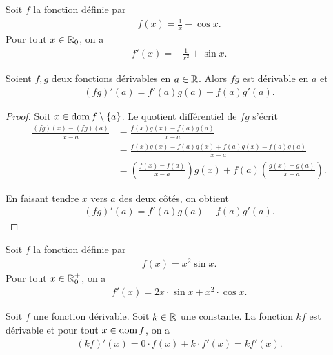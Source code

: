 \documentclass[main.tex]{subfiles}
\begin{document}
\begin{example}
    Soit $f$ la fonction définie par 
    \begin{align}
        f(x) = \frac{1}{x} - \cos x.
    \end{align}
    Pour tout $x \in \mathbb{R}_0$, on a 
    \begin{align}
        f'(x) = -\frac{1}{x^2} + \sin x.
    \end{align}
\end{example}

\begin{proposition}

    Soient $f, g$ deux fonctions dérivables en $a \in \mathbb{R}$.
    Alors $f g$ est dérivable en $a$ et
    \begin{align}
        (f g)'(a) = f'(a) g(a) + f(a) g'(a).
    \end{align}
\end{proposition}
\begin{proof}
    Soit $x \in \operatorname{dom} f \setminus \{a\}$.
    Le quotient différentiel de $f g$ s'écrit
    \begin{align}
        \frac {(f g)(x) - (f g)(a)} {x - a}
        &= \frac {f(x) g(x) - f(a) g(a)} {x - a}\\
        &= \frac {f(x) g(x) - f(a) g(x) + f(a) g(x) - f(a) g(a)} {x - a}\\
        &= \left(\frac {f(x) - f(a)} {x - a}\right) g(x) + f(a) \left(\frac {g(x) - g(a)} {x - a}\right).
    \end{align}

    En faisant tendre $x$ vers $a$ des deux côtés,
    on obtient
    \begin{align}
        (f g)'(a) = f'(a) g(a) + f(a) g'(a).
    \end{align}
\end{proof}

\begin{example}
    Soit $f$ la fonction définie par 
    \begin{align}
        f(x) = x^2 \sin x.
    \end{align}
    Pour tout $x \in \mathbb{R}_0^+$, on a 
    \begin{align}
        f'(x) = 2x \cdot \sin x + x^2 \cdot \cos x.
    \end{align}
\end{example}

\begin{example}
    [Dérivée de $k f(x)$]
    Soit $f$ une fonction dérivable.
    Soit $k \in \mathbb{R}$ une constante. 
    La fonction $kf$ est dérivable et pour tout $x \in \operatorname{dom} f$, on a 
    \begin{align}
        (kf)'(x) = 0 \cdot f(x) + k \cdot f'(x) = kf'(x).
    \end{align}
\end{example}
\end{document}
